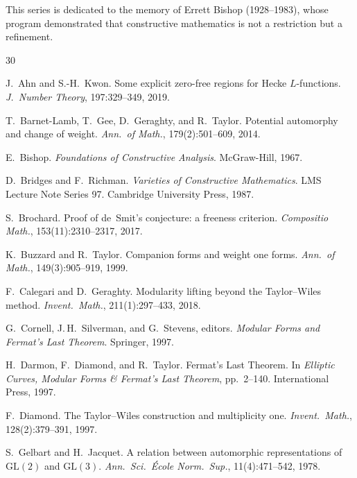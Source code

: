 \documentclass[11pt]{article}
\theoremstyle{plain}
\theoremstyle{definition}
\theoremstyle{remark}
\begin{document}
This series is dedicated to the memory of Errett Bishop (1928--1983),
whose program demonstrated that constructive mathematics is not a
restriction but a refinement.


\begin{thebibliography}{30}

J.~Ahn and S.-H.~Kwon.
\newblock Some explicit zero-free regions for Hecke $L$-functions.
\newblock \textit{J.~Number Theory}, 197:329--349, 2019.

T.~Barnet-Lamb, T.~Gee, D.~Geraghty, and R.~Taylor.
\newblock Potential automorphy and change of weight.
\newblock \textit{Ann.\ of Math.}, 179(2):501--609, 2014.

E.~Bishop.
\newblock \textit{Foundations of Constructive Analysis}.
\newblock McGraw-Hill, 1967.

D.~Bridges and F.~Richman.
\newblock \textit{Varieties of Constructive Mathematics}.
\newblock LMS Lecture Note Series 97. Cambridge University Press, 1987.

S.~Brochard.
\newblock Proof of de~Smit's conjecture: a freeness criterion.
\newblock \textit{Compositio Math.}, 153(11):2310--2317, 2017.

K.~Buzzard and R.~Taylor.
\newblock Companion forms and weight one forms.
\newblock \textit{Ann.\ of Math.}, 149(3):905--919, 1999.

F.~Calegari and D.~Geraghty.
\newblock Modularity lifting beyond the Taylor--Wiles method.
\newblock \textit{Invent.\ Math.}, 211(1):297--433, 2018.

G.~Cornell, J.\,H.~Silverman, and G.~Stevens, editors.
\newblock \textit{Modular Forms and Fermat's Last Theorem}.
\newblock Springer, 1997.

H.~Darmon, F.~Diamond, and R.~Taylor.
\newblock Fermat's Last Theorem.
\newblock In \textit{Elliptic Curves, Modular Forms \& Fermat's Last
Theorem}, pp.~2--140.  International Press, 1997.

F.~Diamond.
\newblock The Taylor--Wiles construction and multiplicity one.
\newblock \textit{Invent.\ Math.}, 128(2):379--391, 1997.

S.~Gelbart and H.~Jacquet.
\newblock A relation between automorphic representations of $\mathrm{GL}(2)$
and $\mathrm{GL}(3)$.
\newblock \textit{Ann.\ Sci.\ \'Ecole Norm.\ Sup.}, 11(4):471--542, 1978.


\end{thebibliography}
\end{document}
